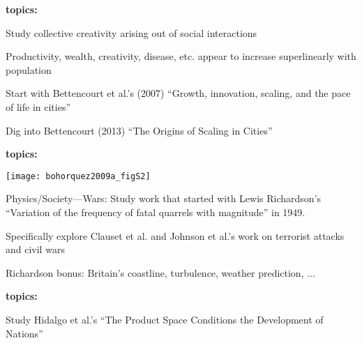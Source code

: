     \small
    
  


      \textbf{topics:}

    
    
     
      Study collective creativity arising out of social interactions
     
      Productivity, wealth, creativity, disease, etc. appear to increase superlinearly with population
     
      Start with Bettencourt et al.'s (2007)
      ``Growth, innovation, scaling, and the pace of life in
      cities''\cite{bettencourt2007a}
     
      Dig into Bettencourt (2013)
      ``The Origins of Scaling in Cities''\cite{bettencourt2007a}
    
    

  
      \textbf{topics:}

          
      \texttt{[image: bohorquez2009a\_figS2]}
      
      
      
      
        Physics/Society---\alert{Wars:} Study work that
        started with Lewis Richardson's ``Variation of the frequency of
        fatal quarrels with magnitude'' in 1949.
      
        Specifically explore Clauset et al. 
        and Johnson et al.'s work\cite{clauset2007b,johnson2006a,bohorquez2009a}
        on terrorist attacks and civil wars
      
        Richardson bonus: Britain's coastline, turbulence, weather prediction, ...
      
      
    
  

      \textbf{topics:}

    
          
      
       
        Study Hidalgo et al.'s ``The Product Space Conditions the Development of Nations''\cite{hidalgo2007a}
       
